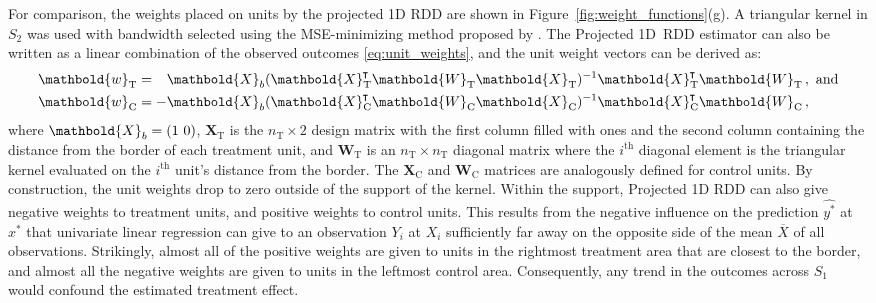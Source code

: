 \documentclass[letter,12pt]{article}
\DeclarePairedDelimiter{\parenthesis}{\lparen}{\rparen}
\newcommand{\del}[1]{\parenthesis*{#1}}
\newcommand*{\trans}{^{\mkern-1.5mu\intercal}}
\newcommand{\treat}{\mathrm{T}}
\newcommand{\ctrol}{\mathrm{C}}
\newcommand{\wvec}{\mathbold{w}}
\newcommand{\eqlabel}[1]{\label{#1}}
\newcommand{\wt}{\wvec_{\treat}}
\newcommand{\wc}{\wvec_{\ctrol}}
\newcommand{\Xmat}{\mathbold{X}}
\newcommand{\Wmat}{\mathbold{W}}
\begin{document}
        For comparison, the weights placed on units by the projected 1D RDD are shown in Figure~\ref{fig:weight_functions}(g).
A triangular kernel in \(S_2\) was used with bandwidth selected using the MSE-minimizing method proposed by \cite{imbens2012optimal}.
The Projected 1D~RDD estimator can also be written as a linear combination of the observed outcomes \eqref{eq:unit_weights}, and the unit weight vectors can be derived as:
\begin{equation}
\begin{split}
\wt &= \hphantom{-} \Xmat_b (\Xmat_\treat\trans \Wmat_\treat \Xmat_\treat)^{-1} \Xmat_\treat\trans \Wmat_\treat \,, 
\text{ and}
\\
\wc &= - \Xmat_b (\Xmat_\ctrol\trans \Wmat_\ctrol \Xmat_\ctrol)^{-1} \Xmat_\ctrol\trans \Wmat_\ctrol \,, 
\end{split}
\eqlabel{eq:unit_weights_llr}
\end{equation}
where \(\Xmat_b = \del{1~0}\), \(\Xmat_\treat\) is the \(n_\treat \times 2\) design matrix with the first column filled with ones and the second column containing the distance from the border of each treatment unit, and \(\Wmat_\treat\) is an \(n_\treat \times n_\treat\) diagonal matrix where the \(i^\mathrm{th}\) diagonal element is the triangular kernel evaluated on the \(i^\mathrm{th}\) unit's distance from the border.
The \(\Xmat_\ctrol\) and \(\Wmat_\ctrol\) matrices are analogously defined for control units.
By construction, the unit weights drop to zero outside of the support of the kernel.
Within the support, Projected 1D RDD can also give negative weights to treatment units, and positive weights to control units.
This results from the negative influence on the prediction \(\widehat{y^*}\) at \(x^*\) that univariate linear regression can give to an observation \(Y_i\) at \(X_i\) sufficiently far away on the opposite side of the mean \(\overline{X}\) of all observations.
Strikingly, almost all of the positive weights are given to units in the rightmost treatment area that are closest to the border, and almost all the negative weights are given to units in the leftmost control area.
Consequently, any trend in the outcomes across \(S_1\) would confound the estimated treatment effect.
\end{document}
